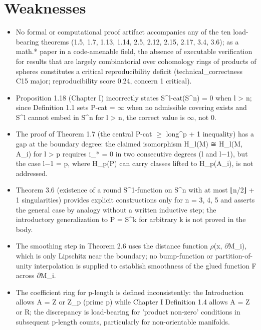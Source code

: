 \documentclass[11pt]{article}
\begin{document}
\section*{Weaknesses}
\begin{itemize}[leftmargin=*]
  \item No formal or computational proof artifact accompanies any of the ten load-bearing theorems (1.5, 1.7, 1.13, 1.14, 2.5, 2.12, 2.15, 2.17, 3.4, 3.6); as a math.* paper in a code-amenable field, the absence of executable verification for results that are largely combinatorial over cohomology rings of products of spheres constitutes a critical reproducibility deficit (technical\_correctness C15 major; reproducibility score 0.24, concern 1 critical).
  \item Proposition 1.18 (Chapter I) incorrectly states S\^{}l-cat(S\^{}n) = 0 when l > n; since Definition 1.1 sets P-cat = \ensuremath{\infty} when no admissible covering exists and S\^{}l cannot embed in S\^{}n for l > n, the correct value is \ensuremath{\infty}, not 0.
  \item The proof of Theorem 1.7 (the central P-cat \ensuremath{\ge} long\^{}p + 1 inequality) has a gap at the boundary degree: the claimed isomorphism H\_l(M) ≅ H\_l(M, A\_i) for l > p requires i\_* = 0 in two consecutive degrees (l and l\ensuremath{-}1), but the case l\ensuremath{-}1 = p, where H\_p(P) can carry classes lifted to H\_p(A\_i), is not addressed.
  \item Theorem 3.6 (existence of a round S\^{}1-function on S\^{}n with at most ⌊n/2⌋ + 1 singularities) provides explicit constructions only for n = 3, 4, 5 and asserts the general case by analogy without a written inductive step; the introductory generalization to P = S\^{}k for arbitrary k is not proved in the body.
  \item The smoothing step in Theorem 2.6 uses the distance function \ensuremath{\rho}(x, \ensuremath{\partial}M\_i), which is only Lipschitz near the boundary; no bump-function or partition-of-unity interpolation is supplied to establish smoothness of the glued function F across \ensuremath{\partial}M\_i.
  \item The coefficient ring for p-length is defined inconsistently: the Introduction allows A = Z or Z\_p (prime p) while Chapter I Definition 1.4 allows A = Z or R; the discrepancy is load-bearing for 'product non-zero' conditions in subsequent p-length counts, particularly for non-orientable manifolds.
\end{itemize}
\end{document}

